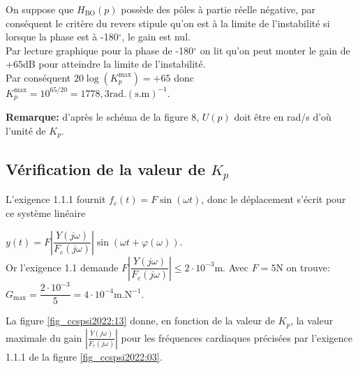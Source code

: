 \ifprof
\begin{corrige}
On suppose que $H_{\text{BO}}(p)$ possède des pôles à partie réelle négative, par conséquent le critère du revers stipule qu'on est à la limite de l'instabilité si lorsque la phase est à -180$^\circ$, le gain est nul.\\

Par lecture graphique pour la phase de -180$^\circ$ on lit qu'on peut monter le gain de $+65$dB pour atteindre la limite de l'instabilité.\\

Par conséquent $20\log(K_p^{\text{max}}) = +65$ donc $\boxed{K_p^{\text{max}} = 10^{65/20} = 1778,3\text{rad}.(\text{s.m})^{-1}}$.

\textbf{Remarque:} d'après le schéma de la figure 8, $U(p)$ doit être en rad/s d'où l'unité de $K_p$.
\end{corrige}
\else
\fi

\subsection{\label{sec:III.B} Vérification de la valeur de $K_{p}$}
\ifprof
\begin{corrige}
L'exigence 1.1.1 fournit $f_c(t) = F \sin(\omega t)$, donc le déplacement s'écrit pour ce système linéaire 

$y(t) = F \left| \dfrac{Y(j\omega)}{F_c(j\omega)} \right| \sin(\omega t + \varphi(\omega))$.\\ 

Or l'exigence 1.1 demande $F \left| \dfrac{Y(j\omega)}{F_c(j\omega)} \right|\leq 2\cdot 10^{-3}$m. Avec $F = 5$N on trouve: $\boxed{G_{\text{max}} = \dfrac{2\cdot 10^{-3}}{5} = 4\cdot 10^{-4}\text{m}.\text{N}^{-1}}$.
\end{corrige}
\else
\fi

\ifprof
\else
La figure \ref{fig_ccspsi2022:13} donne, en fonction de la valeur de $K_{p}$, la valeur maximale du gain $\left|\frac{Y(j \omega)}{F_{c}(j \omega)}\right|$ pour les fréquences cardiaques précisées par l'exigence 1.1.1 de la figure \ref{fig_ccspsi2022:03}.


